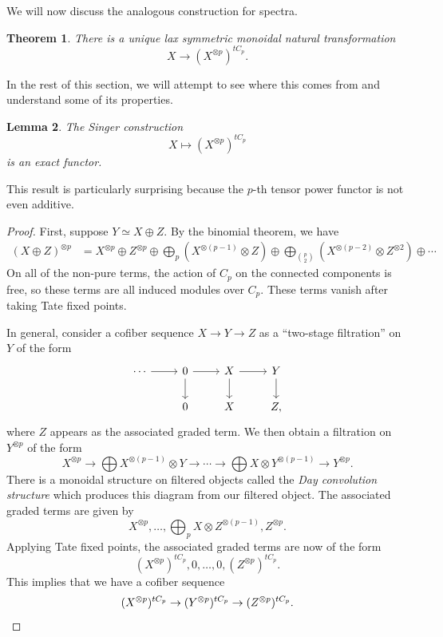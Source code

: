 \documentclass[10pt, oneside]{memoir}
\newtheorem{thm}{Theorem}[subsection]
\newtheorem{lem}[thm]{Lemma}
\theoremstyle{definition}
\theoremstyle{remark}
\theoremstyle{plain}
\theoremstyle{definition}
\theoremstyle{remark}
\newcommand{\1}{\mathbf{1}}
\newcommand{\2}{\mathbf{2}}
\newcommand{\3}{\mathbf{3}}
\begin{document}
We will now discuss the analogous construction for spectra.
\begin{thm}
    There is a unique lax symmetric monoidal natural transformation
    \[ X \to (X^{\otimes p})^{t C_p}. \]
\end{thm}

In the rest of this section, we will attempt to see where this comes from and understand some of its properties.

\begin{lem}
    The Singer construction
    \[ X \mapsto (X^{\otimes p})^{t C_p} \]
    is an exact functor.
\end{lem}
This result is particularly surprising because the \(p \)-th tensor power functor is not even additive.

\begin{proof}
    First, suppose \(Y \simeq X \oplus Z \). By the binomial theorem, we have
    \begin{align*}
        (X \oplus Z)^{\otimes p} &= X^{\otimes p} \oplus Z^{\otimes p} \oplus \bigoplus_p (X^{\otimes (p-1)} \otimes Z) \oplus \bigoplus_{\binom{p}{2}} (X^{\otimes (p-2)} \otimes Z^{\otimes 2})\oplus \cdots
    \end{align*}
    On all of the non-pure terms, the action of \(C_p \) on the connected components is free, so these terms are all induced modules over \(C_p \). These terms vanish after taking Tate fixed points.

    In general, consider a cofiber sequence \(X \to Y \to Z \) as a ``two-stage filtration'' on \(Y \) of the form
    \begin{equation*}
    \begin{tikzcd}
        \cdots \ar{r} & 0 \ar{r} \ar{d} & X \ar{r} \ar{d} & Y \ar{d} \\
        &  0 & X & Z,
    \end{tikzcd}
    \end{equation*}
    where \(Z \) appears as the associated graded term. We then obtain a filtration on \(Y^{\otimes p} \) of the form
    \[ X^{\otimes p} \to \bigoplus X^{\otimes (p-1)} \otimes Y \to \cdots \to \bigoplus X \otimes Y^{\otimes (p-1)} \to Y^{\otimes p}. \]
    There is a monoidal structure on filtered objects called the \textit{Day convolution structure} which produces this diagram from our filtered object. The associated graded terms are given by
    \[ X^{\otimes p}, \ldots, \bigoplus_p X \otimes Z^{\otimes (p-1)}, Z^{\otimes p}. \]
    Applying Tate fixed points, the associated graded terms are now of the form
    \[ (X^{\otimes p})^{tC_p}, 0, \ldots, 0, (Z^{\otimes p})^{t C_p}. \]
    This implies that we have a cofiber sequence
    \[ (X^{\otimes p})^{t C_p} \to (Y^{\otimes p})^{t C_p} \to (Z^{\otimes p})^{t C_p}. \qedhere \]
\end{proof}
\end{document}
